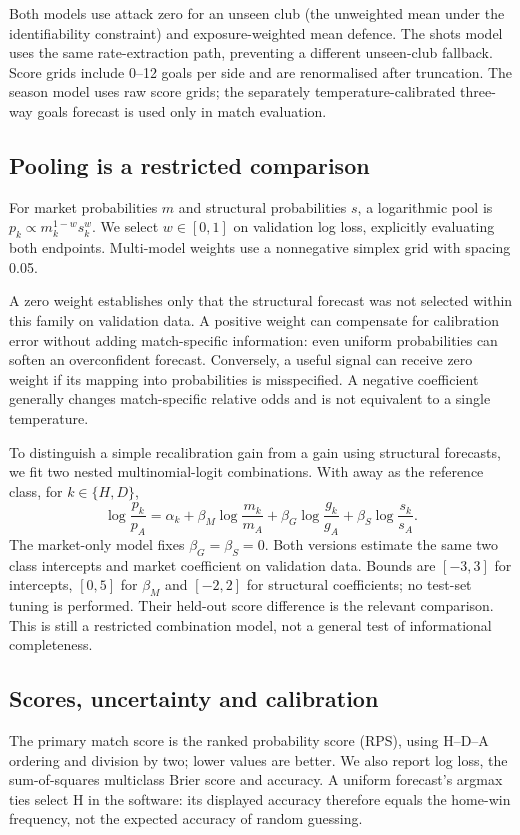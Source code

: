 \documentclass[11pt]{article}
\begin{document}
Both models use attack zero for an unseen club (the unweighted mean under the
identifiability constraint) and exposure-weighted mean defence. The shots model
uses the same rate-extraction path, preventing a different unseen-club fallback.
Score grids include 0--12 goals per side and are renormalised after truncation.
The season model uses raw score grids; the separately temperature-calibrated
three-way goals forecast is used only in match evaluation.

\subsection{Pooling is a restricted comparison}
For market probabilities $m$ and structural probabilities $s$, a logarithmic
pool is $p_k\propto m_k^{1-w}s_k^w$. We select $w\in[0,1]$ on validation log
loss, explicitly evaluating both endpoints. Multi-model weights use a
nonnegative simplex grid with spacing 0.05.

A zero weight establishes only that the structural forecast was not selected
within this family on validation data. A positive weight can compensate for
calibration error without adding match-specific information: even uniform
probabilities can soften an overconfident forecast. Conversely, a useful signal
can receive zero weight if its mapping into probabilities is misspecified.
A negative coefficient generally changes match-specific relative odds and is
not equivalent to a single temperature.

To distinguish a simple recalibration gain from a gain using structural
forecasts, we fit two nested multinomial-logit combinations. With away as the
reference class, for $k\in\{H,D\}$,
\[
 \log\frac{p_k}{p_A}
 =\alpha_k+\beta_M\log\frac{m_k}{m_A}
   +\beta_G\log\frac{g_k}{g_A}
   +\beta_S\log\frac{s_k}{s_A}.
\]
The market-only model fixes $\beta_G=\beta_S=0$. Both versions estimate the
same two class intercepts and market coefficient on validation data.
Bounds are $[-3,3]$ for intercepts, $[0,5]$ for $\beta_M$ and $[-2,2]$ for
structural coefficients; no test-set tuning is performed. Their held-out
score difference is the relevant comparison. This is still a restricted
combination model, not a general test of informational completeness.

\subsection{Scores, uncertainty and calibration}
The primary match score is the ranked probability score (RPS), using H--D--A
ordering and division by two; lower values are better. We also report log loss,
the sum-of-squares multiclass Brier score and accuracy. A uniform forecast's
argmax ties select H in the software: its displayed accuracy therefore equals
the home-win frequency, not the expected accuracy of random guessing.
\end{document}
